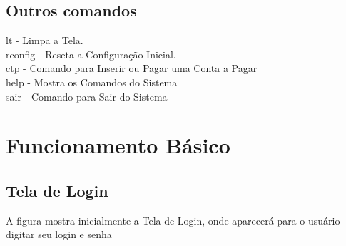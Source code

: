 \documentclass{article}
\begin{document}
	\subsection{Outros comandos}
	\textbullet lt - Limpa a Tela.\\
	\textbullet rconfig - Reseta a Configuração Inicial.\\
	\textbullet ctp - Comando para Inserir ou Pagar uma Conta a Pagar\\
	\textbullet help - Mostra os Comandos do Sistema\\
	\textbullet sair - Comando para Sair do Sistema\\
\section{Funcionamento Básico}
\subsection{Tela de Login}
A figura mostra inicialmente a Tela de Login, onde aparecerá para o usuário digitar seu login e senha
\end{document}
